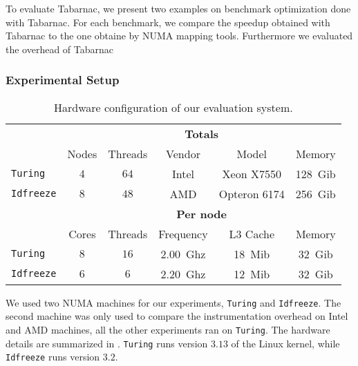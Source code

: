 
To evaluate \gls{Tabarnac}, we present two examples on benchmark optimization done with \gls{Tabarnac}.
For each benchmark, we compare the speedup obtained with \gls{Tabarnac} to the one obtaine by \gls{NUMA} mapping tools.
Furthermore we evaluated the overhead of \gls{Tabarnac}

\subsubsection{Experimental Setup}


\begin{table}[htb]
    \centering
    \begin{tabular}{lccccc}
        \toprule
        & \multicolumn{5}{c}{\textbf{Totals}}\\
        & Nodes & Threads & Vendor & Model & Memory \\
        \cmidrule(lr){2-6}
        \texttt{Turing}   & $4$ & $64$ & Intel & Xeon X7550   & \SI{128}{Gib} \\
        \texttt{Idfreeze} & $8$ & $48$ & AMD   & Opteron 6174 & \SI{256}{Gib}\\
        \midrule
        & \multicolumn{5}{c}{\textbf{Per node}}\\
        & Cores & Threads & Frequency & L3 Cache & Memory \\
        \cmidrule(lr){2-6}
        \texttt{Turing}   & $8$ & $16$ & \SI{2.00}{Ghz}& \SI{18}{Mib} & \SI{32}{Gib} \\
        \texttt{Idfreeze} & $6$ & $6$  & \SI{2.20}{Ghz}& \SI{12}{Mib} & \SI{32}{Gib}\\
        \bottomrule
    \end{tabular}
    \caption{Hardware configuration of our evaluation system.}
    \label{tab:turing-hw}
\end{table}

We used two NUMA machines for our experiments, \texttt{Turing} and \texttt{Idfreeze}.
The second machine was only used to compare the instrumentation overhead on Intel and AMD machines, all the other experiments ran on \texttt{Turing}.
The hardware details are summarized in .
\texttt{Turing} runs version $3.13$ of the Linux kernel, while \texttt{Idfreeze} runs version $3.2$.

